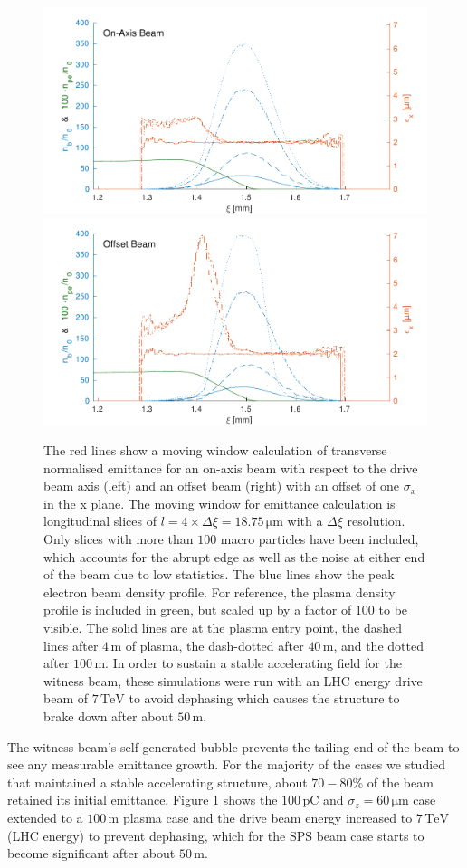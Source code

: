 \documentclass[aps,prstab,reprint,amsmath,amssymb,groupedaddress]{revtex4-1}
\newcommand{\unit}[1]{\,\mathrm{#1}}
\begin{document}

\begin{figure}[hbt]
    \includegraphics[width=0.495\linewidth,trim={2mm 0mm 2mm 0mm},clip]{figures/beamEmittance}
    \includegraphics[width=0.495\linewidth,trim={2mm 0mm 2mm 0mm},clip]{figures/beamEmittanceOffset}
    \caption{\label{Fig:BeamEmitt} The red lines show a moving window calculation of transverse normalised emittance for
        an on-axis beam with respect to the drive beam axis (left) and an offset beam (right) with an offset of one
        $\sigma_{x}$ in the x plane. The moving window for emittance calculation is longitudinal slices of
        $l = 4\times\Delta\xi = 18.75\unit{\mu m}$ with a $\Delta\xi$ resolution. Only slices with more than $100$ macro
        particles have been included, which accounts for the abrupt edge as well as the noise at either end of the beam
        due to low statistics. The blue lines show the peak electron beam density profile. For reference, the plasma 
        density profile is included in green, but scaled up by a factor of $100$ to be visible. The solid lines are at
        the plasma entry point, the dashed lines after $4\unit{m}$ of plasma, the dash-dotted after $40\unit{m}$, and
        the dotted after $100\unit{m}$. In order to sustain a stable accelerating field for the witness beam, these
        simulations were run with an LHC energy drive beam of $7\unit{TeV}$ to avoid dephasing which causes the
        structure to brake down after about $50\unit{m}$.}
\end{figure}

The witness beam's self-generated bubble prevents the tailing end of the beam to see any measurable emittance growth.
For the majority of the cases we studied that maintained a stable accelerating structure, about $70-80\%$ of the beam
retained its initial emittance. Figure \ref{Fig:BeamEmitt} shows the $100\unit{pC}$ and $\sigma_{z} = 60\unit{\mu m}$
case extended to a $100\unit{m}$ plasma case and the drive beam energy increased to $7\unit{TeV}$ (LHC energy) to
prevent dephasing, which for the SPS beam case starts to become significant after about $50\unit{m}$.
\end{document}
